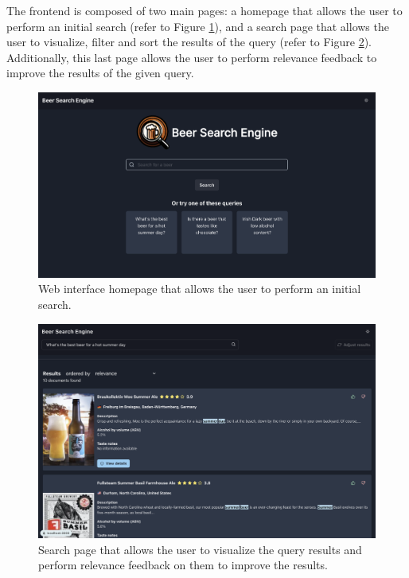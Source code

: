 The frontend is composed of two main pages: a homepage that allows the user to perform an initial search (refer to Figure \ref{fig:home-page}), and a search page that allows the user to visualize, filter and sort the results of the query (refer to Figure \ref{fig:seach-page}). Additionally, this last page allows the user to perform relevance feedback to improve the results of the given query.

\begin{figure}[H]
  \centering
  \includegraphics[width=1\textwidth]{img/3_implementation/homepage.png}
  \caption{Web interface homepage that allows the user to perform an initial search.}
  \label{fig:home-page}
\end{figure}

\begin{figure}[H]
  \centering
  \includegraphics[width=1\textwidth]{img/3_implementation/search-page.png}
  \caption{Search page that allows the user to visualize the query results and perform relevance feedback on them to improve the results.}
  \label{fig:seach-page}
\end{figure}

